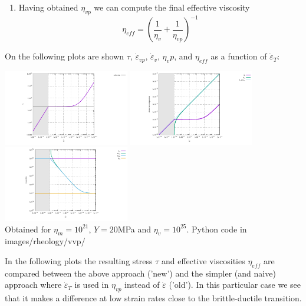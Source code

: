 \begin{itemize}
\begin{enumerate}
\item Having obtained $\eta_{vp}$ we can compute the final effective viscosity
\[
\eta_{eff} = \left( \frac{1}{\eta_v}  + \frac{1}{\eta_{vp}}  \right)^{-1}
\]
\end{enumerate}

On the following plots are shown $\tau$, 
$\dot\varepsilon_{vp}$, $\dot\varepsilon_v$, $\eta_vp$, and $\eta_{eff}$ 
as a function of  $\dot\varepsilon_T$: 

\begin{center}
\includegraphics[width=5.5cm]{images/rheology/vvp/tau.pdf}
\includegraphics[width=5.5cm]{images/rheology/vvp/strainrates.pdf}
\includegraphics[width=5.5cm]{images/rheology/vvp/viscosities.pdf}\\
{\captionfont Obtained for $\eta_m=10^{21}$, $Y=20$MPa and $\eta_v=10^{25}$. Python code 
in images/rheology/vvp/}
\end{center}

In the following plots the resulting stress $\tau$ and effective viscosities $\eta_{eff}$
are compared between the above approach ('new') and the simpler (and naive) 
approach where $\dot\varepsilon_T$ 
is used in $\eta_{vp}$ instead of $\dot\varepsilon$ ('old'). In this particular case 
we see that it makes a difference at low strain rates close to the brittle-ductile transition.


\end{itemize}
